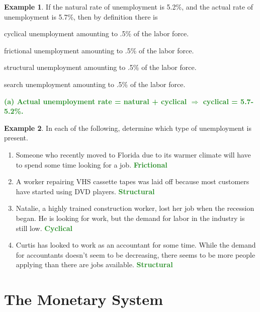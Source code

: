 \documentclass[11pt]{article}\usepackage[]{graphicx}\usepackage[]{color}
\theoremstyle{definition}
\newtheorem{exmp}{Example}[section]
\newcommand{\ddp}[1]{{\textbf{\textcolor{ForestGreen}{#1}}}}
\begin{document}
\begin{exmp} If the natural rate of unemployment is 5.2\%, and the actual rate of unemployment is 5.7\%, then by definition there is 

\begin{enumerate}[(a)]
	{\setlength\itemindent{25pt} \item cyclical unemployment amounting to .5\% of the labor force.}
	{\setlength\itemindent{25pt} \item frictional unemployment amounting to .5\% of the labor force.}
	{\setlength\itemindent{25pt} \item structural unemployment amounting to .5\% of the labor force.}
	{\setlength\itemindent{25pt} \item search unemployment amounting to .5\% of the labor force.}
\end{enumerate}
\end{exmp}
\ddp{(a) Actual unemployment rate = natural + cyclical $\Rightarrow$ cyclical = 5.7-5.2\%.}

\begin{exmp}
	
	In each of the following, determine which type of unemployment is present.

\begin{enumerate}
	\setlength{\itemsep}{1em}
	\item Someone who recently moved to Florida due to its warmer climate will have to spend some time looking for a job. \ddp{Frictional}
	\item A worker repairing VHS cassette tapes was laid off because most customers have started using DVD players. \ddp{Structural}
	\item Natalie, a highly trained construction worker, lost her job when the recession began. He is looking for work, but the demand for labor in the industry is still low.
	\ddp{Cyclical}
	\item Curtis has looked to work as an accountant for some time. While the demand for accountants doesn't seem to be decreasing, there seems to be more people applying than there are jobs available. 
	\ddp{Structural}
\end{enumerate}
\end{exmp}

\newpage

\section{The Monetary System}
\end{document}
